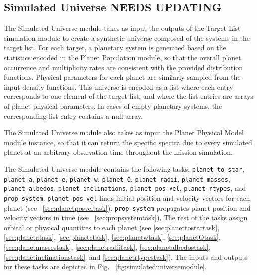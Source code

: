 \documentclass[cleanfoot]{asme2ej}
\begin{document}

\subsection{Simulated Universe NEEDS UPDATING} \label{sec:simulateduniverse}
The Simulated Universe module takes as input the outputs of the Target List simulation module to create a synthetic universe composed of the systems in the target list.  For each target, a planetary system is generated based on the statistics encoded in the Planet Population module, so that the overall planet occurrence and multiplicity rates are consistent with the provided distribution functions.  Physical parameters for each planet are similarly sampled from the input density functions.  This universe is encoded as a list where each entry corresponds to one element of the target list, and where the list entries are arrays of planet physical parameters.  In cases of empty planetary systems, the corresponding list entry contains a null array.

The Simulated Universe module also takes as input the Planet Physical Model module instance, so that it can return the specific spectra due to every simulated planet at an arbitrary observation time throughout the mission simulation.

The Simulated Universe module contains the following tasks: \verb+planet_to_star+, \verb+planet_a+, \verb+planet_e+, \verb+planet_w+, \verb+planet_O+, \verb+planet_radii+, \verb+planet_masses+, \verb+planet_albedos+, \verb+planet_inclinations+, \verb+planet_pos_vel+, \verb+planet_rtypes+, and \verb+prop_system+.  \verb+planet_pos_vel+ finds initial position and velocity vectors for each planet (see ~\ref{sec:planetposveltask}).  \verb+prop_system+ propagates planet position and velocity vectors in time (see ~\ref{sec:propsystemtask}).  The rest of the tasks assign orbital or physical quantities to each planet (see \ref{sec:planettostartask}, \ref{sec:planetatask}, \ref{sec:planetetask}, \ref{sec:planetwtask}, \ref{sec:planetOtask}, \ref{sec:planetmassestask}, \ref{sec:planetradiitask}, \ref{sec:planetalbedostask}, \ref{sec:planetinclinationstask}, and \ref{sec:planetrtypestask}). The inputs and outputs for these tasks are depicted in Fig. ~\ref{fig:simulateduniversemodule}.
\end{document}
